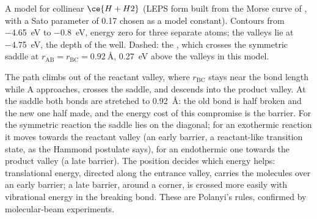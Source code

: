 \begin{omfigure}

{\small A model  for collinear $\ce{H + H2}$ (LEPS form built
from the Morse curve of , with a Sato parameter of 0.17 chosen as a model
constant). Contours from \qty{-4.65}{eV} to \qty{-0.8}{eV}, energy zero for three separate atoms;
the valleys lie at \qty{-4.75}{eV}, the depth of the  well. Dashed: the , which crosses the symmetric saddle at $r_{\mathrm{AB}} = r_{\mathrm{BC}} = \qty{0.92}{\angstrom}$,
\qty{0.27}{eV} above the valleys in this model.}
\end{omfigure}

The path climbs out of the reactant valley, where $r_{\mathrm{BC}}$ stays near the 
bond length while A approaches, crosses the saddle, and descends into the
product valley. At the saddle both bonds are stretched to \qty{0.92}{\angstrom}: the old
bond is half broken and the new one half made, and the energy cost of this
compromise is the barrier. For the symmetric reaction the saddle lies on the
diagonal; for an exothermic reaction it moves towards the reactant valley (an
early barrier, a reactant-like transition state, as the Hammond postulate
says), for an endothermic one towards the product valley (a late barrier).
The position decides which energy helps: translational energy, directed along
the entrance valley, carries the molecules over an early barrier; a late
barrier, around a corner, is crossed more easily with vibrational energy in the
breaking bond. These are Polanyi's rules, confirmed by molecular-beam
experiments.

